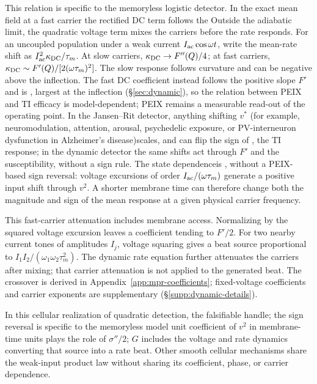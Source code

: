 \documentclass[11pt,a4paper]{article}
\newcommand{\Sig}{\sigma}
\providecommand{\DIFaddtex}[1]{{\protect\color{blue} \sf #1}} %
\providecommand{\DIFdeltex}[1]{{\protect\color{red} \scriptsize #1}} %
\providecommand{\DIFaddbegin}{} %
\providecommand{\DIFaddend}{} %
\providecommand{\DIFdelbegin}{} %
\providecommand{\DIFdelend}{} %
\providecommand{\DIFadd}[1]{\texorpdfstring{\DIFaddtex{#1}}{#1}} %
\providecommand{\DIFdel}[1]{\texorpdfstring{\DIFdeltex{#1}}{}} %
\begin{document}
\DIFdelbegin \DIFdel{This relation is specific to the memoryless logistic detector. In the exact mean field at a fast carrier the rectified DC term
follows the }\DIFdelend \DIFaddbegin \DIFadd{Outside the adiabatic limit, the quadratic voltage term mixes the carriers
before the rate responds. For an uncoupled population under a weak current
$I_{\rm ac}\cos\omega t$, write the mean-rate shift as
$I_{\rm ac}^2\kappa_{\rm DC}/\tau_m$. At slow carriers,
$\kappa_{\rm DC}\to F''(Q)/4$; at fast carriers,
$\kappa_{\rm DC}\sim F'(Q)/[2(\omega\tau_m)^2]$.
The slow response follows curvature and can be negative above the inflection.
The fast DC coefficient instead follows the positive }\DIFaddend slope $F'$\DIFdelbegin \DIFdel{and is }\DIFdelend \DIFaddbegin \DIFadd{, }\DIFaddend largest at the
inflection\DIFdelbegin \DIFdel{(\S\ref{sec:dynamic}), so the relation between PEIX and TI efficacy is model-dependent; PEIX remains a measurable
read-out of the operating point.
In the
Jansen--Rit detector, anything shifting $v^*$
(for example, neuromodulation, attention, arousal, psychedelic exposure, or
PV-interneuron dysfunction in
Alzheimer's disease)scales, and can flip the sign of , the TI response; in
the dynamic detector the same shifts act through $F'$ and the susceptibility, without a sign rule. The state dependenceis }\DIFdelend \DIFaddbegin \DIFadd{, without a PEIX-based sign reversal: voltage excursions of order
$I_{\rm ac}/(\omega\tau_m)$ generate a positive input shift through $v^2$.
A shorter membrane time can therefore change both the magnitude and sign
of the mean response at a given physical carrier frequency.
}

\DIFadd{This fast-carrier attenuation includes membrane access. Normalizing by the
squared voltage excursion leaves a coefficient tending to $F'/2$.
For two nearby current tones of amplitudes $I_j$, voltage squaring gives a
beat source proportional to $I_1I_2/(\omega_1\omega_2\tau_m^2)$.
The dynamic rate equation further attenuates the carriers after mixing;
that carrier attenuation is not applied to the generated beat. The crossover is derived in
Appendix~\ref{app:mpr-coefficients}; fixed-voltage coefficients and carrier
exponents are supplementary (\S\ref{supp:dynamic-details}).
}

\DIFadd{In this cellular realization of quadratic detection, }\DIFaddend the \DIFdelbegin \DIFdel{falsifiable handle; the sign reversal is specific
to the memoryless model}\DIFdelend \DIFaddbegin \DIFadd{unit coefficient of $v^2$ in membrane-time units
plays the role of $\Sig''/2$; $G$ includes the voltage and rate dynamics
converting that source into a rate beat. Other smooth cellular mechanisms
share the weak-input product law without sharing its coefficient, phase,
or carrier dependence}\DIFaddend .
\end{document}
